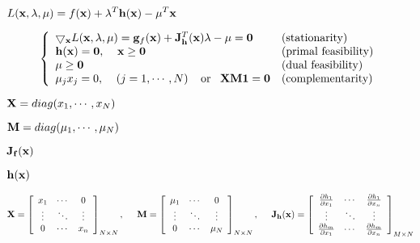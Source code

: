 \documentclass{article}
\def\lthtmlcheckvsize{\ifdim\ht\sizebox<\vsize 
  \ifdim\wd\sizebox<\hsize\expandafter\hfill\fi \expandafter\vfill
  \else\expandafter\vss\fi}%
\begin{document}
{\newpage\clearpage
{}%
$\displaystyle L({\bf x},{\bf\lambda},{\bf\mu})=f({\bf x})
+{\bf\lambda}^T{\bf h}({\bf x})-{\bf\mu}^T{\bf x}$%
\lthtmlindisplaymathZ
\lthtmlcheckvsize\clearpage}

{\newpage\clearpage
{}%
\begin{displaymath}\left\{
\begin{array}{ll}
\bigtriangledown_{\bf x} L({\bf x},{\bf\lambda},{\bf\mu})
={\bf g}_f({\bf x})+{\bf J}_{\bf h}^T({\bf x}){\bf\lambda}-{\bf\mu}
={\bf0}&
\mbox{(stationarity)}\\
{\bf h}({\bf x})={\bf0},\;\;\;\;{\bf x}\ge{\bf0} &
\mbox{(primal feasibility)}\\
{\bf\mu}\ge {\bf0} & \mbox{(dual feasibility)}\\
\mu_j x_j=0,\;\;\;\;(j=1,\cdots,N)\;\;\;\;\mbox{or}\;\;\;
{\bf XM1}={\bf0} & \mbox{(complementarity)}
\end{array}\right.\end{displaymath}%
\lthtmldisplayZ
\lthtmlcheckvsize\clearpage}

{\newpage\clearpage
{}%
$ {\bf X}=diag(x_1,\cdots,x_N)$%
\lthtmlindisplaymathZ
\lthtmlcheckvsize\clearpage}

{\newpage\clearpage
{}%
$ {\bf M}=diag(\mu_1,\cdots,\mu_N)$%
\lthtmlindisplaymathZ
\lthtmlcheckvsize\clearpage}

{\newpage\clearpage
{}%
$ {\bf J}_{\bf f}({\bf x})$%
\lthtmlindisplaymathZ
\lthtmlcheckvsize\clearpage}

{\newpage\clearpage
{}%
$ {\bf h}({\bf x})$%
\lthtmlindisplaymathZ
\lthtmlcheckvsize\clearpage}

{\newpage\clearpage
{}%
$\displaystyle {\bf X}=\left[\begin{array}{ccc}x_1&\cdots&0\\
\vdots&\ddots&\vdots\\0&\cdots&x_n \end{array}\right]_{N\times N},
\;\;\;\;\;
{\bf M}=\left[\begin{array}{ccc}\mu_1&\cdots&0\\
\vdots&\ddots&\vdots\\0&\cdots&\mu_N
\end{array}\right]_{N\times N},
\;\;\;\;\;
{\bf J}_{\bf h}({\bf x})=\left[\begin{array}{ccc}
\frac{\partial h_1}{\partial x_1}&\cdots&
\frac{\partial h_1}{\partial x_n}\\
\vdots & \ddots & \vdots\\
\frac{\partial h_m}{\partial x_1}&\cdots&
\frac{\partial h_m}{\partial x_n}\end{array}\right]_{M\times N}$%
\lthtmlindisplaymathZ
\lthtmlcheckvsize\clearpage}
\end{document}
